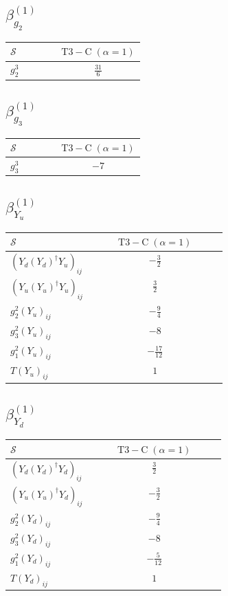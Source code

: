 \documentclass[9pt]{article}
\begin{document}
\subsection*{$ \beta_{g_2}^{(1)} $}
\begin{longtable}{@{}p{0.38\linewidth}c@{}}
\toprule
$\mathcal{S}$ & $ \mathrm{T3-C}\;(\alpha=1) $ \\
\midrule
$ g_2^3 $ & $ \frac{31}{6} $ \\
\bottomrule
\end{longtable}
\subsection*{$ \beta_{g_3}^{(1)} $}
\begin{longtable}{@{}p{0.38\linewidth}c@{}}
\toprule
$\mathcal{S}$ & $ \mathrm{T3-C}\;(\alpha=1) $ \\
\midrule
$ g_3^3 $ & $ -7 $ \\
\bottomrule
\end{longtable}
\subsection*{$ \beta_{Y_u}^{(1)} $}
\begin{longtable}{@{}p{0.38\linewidth}c@{}}
\toprule
$\mathcal{S}$ & $ \mathrm{T3-C}\;(\alpha=1) $ \\
\midrule
$ (Y_d (Y_d)^{\dagger} Y_u)_{ij} $ & $ - \frac{3}{2} $ \\
$ (Y_u (Y_u)^{\dagger} Y_u)_{ij} $ & $ \frac{3}{2} $ \\
$ g_2^2 (Y_u)_{ij} $ & $ - \frac{9}{4} $ \\
$ g_3^2 (Y_u)_{ij} $ & $ -8 $ \\
$ g_1^2 (Y_u)_{ij} $ & $ - \frac{17}{12} $ \\
$ T (Y_u)_{ij} $ & $ 1 $ \\
\bottomrule
\end{longtable}
\subsection*{$ \beta_{Y_d}^{(1)} $}
\begin{longtable}{@{}p{0.38\linewidth}c@{}}
\toprule
$\mathcal{S}$ & $ \mathrm{T3-C}\;(\alpha=1) $ \\
\midrule
$ (Y_d (Y_d)^{\dagger} Y_d)_{ij} $ & $ \frac{3}{2} $ \\
$ (Y_u (Y_u)^{\dagger} Y_d)_{ij} $ & $ - \frac{3}{2} $ \\
$ g_2^2 (Y_d)_{ij} $ & $ - \frac{9}{4} $ \\
$ g_3^2 (Y_d)_{ij} $ & $ -8 $ \\
$ g_1^2 (Y_d)_{ij} $ & $ - \frac{5}{12} $ \\
$ T (Y_d)_{ij} $ & $ 1 $ \\
\bottomrule
\end{longtable}
\end{document}

